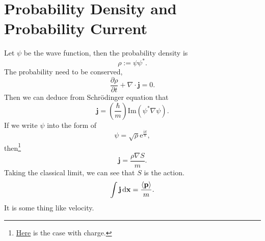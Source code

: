 \documentclass{article}
\theoremstyle{1}
\newcommand{\pa}{\partial}
\newcommand{\ii}{\mathrm{i}}
\newcommand{\ee}{\mathrm{e}}
\begin{document}
\section{Probability Density and Probability Current}
Let $\psi $ be  the wave function, then the probability density is
\begin{equation}
    \rho:=\psi\psi^*.
\end{equation}
The probability need to be conserved,
\begin{equation}
    \frac{\pa \rho}{\pa t}+\nabla \cdot\mathbf{j}=0.
\end{equation}
Then we can deduce from Schrödinger equation that 
\begin{equation}
    \mathbf{j}=\left(\frac{\hbar}{m}\right)\mathrm{Im}(\psi^*\nabla\psi).
\end{equation}
If we write $\psi$ into the form of 
\begin{equation}
    \psi=\sqrt{\rho}\ee^{\frac{\ii S}{\hbar}},
\end{equation}
then\footnote{\hyperref[charged case]{Here} is the case with charge.} 
\begin{equation}
    \mathbf{j}=\frac{\rho\nabla S}{m}.
\end{equation}
Taking the classical limit, we can see that $S$ is the action.
\begin{equation}
    \int\mathbf{j}\dd{\mathbf{x}}=\frac{\expval{\mathbf{p}}}{m}.
\end{equation}
It is some thing like velocity.
\end{document}
